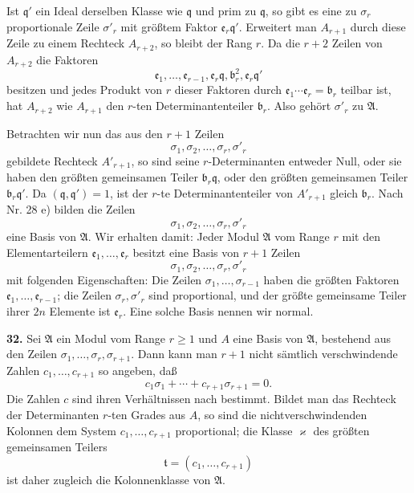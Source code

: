 \documentclass[11pt,a4paper]{article}
\begin{document}
Ist \(\mathfrak q'\) ein Ideal derselben Klasse wie \(\mathfrak q\) und prim zu \(\mathfrak q\), so gibt es eine zu \(\sigma_r\) proportionale Zeile \(\sigma'_r\) mit größtem Faktor \(\mathfrak e_r\mathfrak q'\). Erweitert man \(A_{r+1}\) durch diese Zeile zu einem Rechteck \(A_{r+2}\), so bleibt der Rang \(r\). Da die \(r+2\) Zeilen von \(A_{r+2}\) die Faktoren
\[
 \mathfrak e_1,\ldots,\mathfrak e_{r-1},\mathfrak e_r\mathfrak q,
 \mathfrak b_r^2,\mathfrak e_r\mathfrak q'
\]
besitzen und jedes Produkt von \(r\) dieser Faktoren durch \(\mathfrak e_1\cdots\mathfrak e_r=\mathfrak b_r\) teilbar ist, hat \(A_{r+2}\) wie \(A_{r+1}\) den \(r\)-ten Determinantenteiler \(\mathfrak b_r\). Also gehört \(\sigma'_r\) zu \(\mathfrak A\).

Betrachten wir nun das aus den \(r+1\) Zeilen
\[
 \sigma_1,\sigma_2,\ldots,\sigma_r,\sigma'_r
\]
gebildete Rechteck \(A'_{r+1}\), so sind seine \(r\)-Determinanten entweder Null, oder sie haben den größten gemeinsamen Teiler \(\mathfrak b_r\mathfrak q\), oder den größten gemeinsamen Teiler \(\mathfrak b_r\mathfrak q'\). Da \((\mathfrak q,\mathfrak q')=1\), ist der \(r\)-te Determinantenteiler von \(A'_{r+1}\) gleich \(\mathfrak b_r\). Nach Nr. 28 e) bilden die Zeilen
\[
 \sigma_1,\sigma_2,\ldots,\sigma_r,\sigma'_r
\]
eine Basis von \(\mathfrak A\). Wir erhalten damit: Jeder Modul \(\mathfrak A\) vom Range \(r\) mit den Elementarteilern \(\mathfrak e_1,\ldots,\mathfrak e_r\) besitzt eine Basis von \(r+1\) Zeilen
\[
 \sigma_1,\sigma_2,\ldots,\sigma_r,\sigma'_r
\]
mit folgenden Eigenschaften: Die Zeilen \(\sigma_1,\ldots,\sigma_{r-1}\) haben die größten Faktoren \(\mathfrak e_1,\ldots,\mathfrak e_{r-1}\); die Zeilen \(\sigma_r,\sigma'_r\) sind proportional, und der größte gemeinsame Teiler ihrer \(2n\) Elemente ist \(\mathfrak e_r\). Eine solche Basis nennen wir normal.

\textbf{32.} Sei \(\mathfrak A\) ein Modul vom Range \(r\ge1\) und \(A\) eine Basis von \(\mathfrak A\), bestehend aus den Zeilen \(\sigma_1,\ldots,\sigma_r,\sigma_{r+1}\). Dann kann man \(r+1\) nicht sämtlich verschwindende Zahlen \(c_1,\ldots,c_{r+1}\) so angeben, daß
\[
 c_1\sigma_1+\cdots+c_{r+1}\sigma_{r+1}=0. \tag{37}
\]
Die Zahlen \(c\) sind ihren Verhältnissen nach bestimmt. Bildet man das Rechteck der Determinanten \(r\)-ten Grades aus \(A\), so sind die nichtverschwindenden Kolonnen dem System \(c_1,\ldots,c_{r+1}\) proportional; die Klasse \(\varkappa\) des größten gemeinsamen Teilers
\[
 \mathfrak t=(c_1,\ldots,c_{r+1})
\]
ist daher zugleich die Kolonnenklasse von \(\mathfrak A\).
\end{document}
